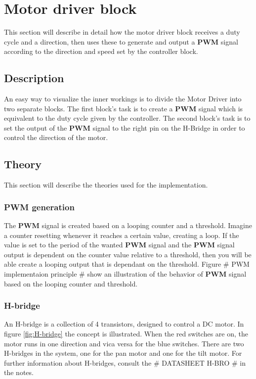 \section{Motor driver block}

This section will describe in detail how the motor driver block receives a duty cycle and a direction, then uses these to generate and output a \textbf{PWM} signal according to the direction and speed set by the controller block.

\subsection{Description}

An easy way to visualize the inner workings is to divide the Motor Driver into two separate blocks. The first block’s task is to create a \textbf{PWM} signal which is equivalent to the duty cycle given by the controller. The second block’s task is to set the output of the \textbf{PWM} signal to the right pin on the H-Bridge in order to control the direction of the motor.

\subsection{Theory}

This section will describe the theories used for the implementation.

\subsubsection{PWM generation}

The \textbf{PWM} signal is created based on a looping counter and a threshold. Imagine a counter resetting whenever it reaches a certain value, creating a loop. If the value is set to the period of the wanted \textbf{PWM} signal and the \textbf{PWM} signal output is dependent on the counter value relative to a threshold, then you will be able create a looping output that is dependant on the threshold. Figure \# PWM implementaion principle \# show an illustration of the behavior of \textbf{PWM} signal based on the looping counter and threshold.

\subsubsection{H-bridge}
An H-bridge is a collection of 4 transistors, designed to control a DC motor. In figure \ref{fig:H-bridge} the concept is illustrated. When the red switches are on, the motor runs in one direction and vica versa for the blue switches. There are two H-bridges in the system, one for the pan motor and one for the tilt motor. For further information about H-bridges, consult the \# DATASHEET H-BRO \# in the notes.

